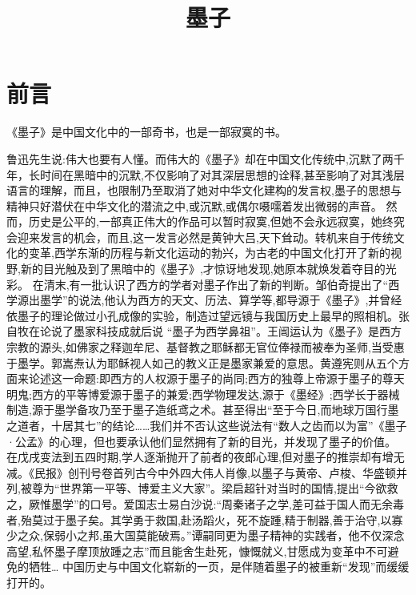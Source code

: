 \documentclass[12pt,UTF8]{ctexbook}
\title{\heiti\zihao{0} 墨子}
\author{}
\date{}
\begin{document}
\maketitle
\tableofcontents

\frontmatter
\chapter{前言}

《墨子》是中国文化中的一部奇书，也是一部寂寞的书。

鲁迅先生说:伟大也要有人懂。而伟大的《墨子》却在中国文化传统中,沉默了两千年，长时间在黑暗中的沉默,不仅影响了对其深层思想的诠释,甚至影响了对其浅层语言的理解，而且，也限制乃至取消了她对中华文化建构的发言权,墨子的思想与精神只好潜伏在中华文化的潜流之中,或沉默,或偶尔嗫嚅着发出微弱的声音。
然而，历史是公平的,一部真正伟大的作品可以暂时寂寞,但她不会永远寂寞，她终究会迎来发言的机会，而且,这一发言必然是黄钟大吕,天下耸动。转机来自于传统文化的变革,西学东渐的历程与新文化运动的勃兴，为古老的中国文化打开了新的视野,新的目光触及到了黑暗中的《墨子》,才惊讶地发现,她原本就焕发着夺目的光彩。
在清末,有一批认识了西方的学者对墨子作出了新的判断。邹伯奇提出了“西学源出墨学”的说法,他认为西方的天文、历法、算学等,都导源于《墨子》,并曾经依墨子的理论做过小孔成像的实验，制造过望远镜与我国历史上最早的照相机。张自牧在论说了墨家科技成就后说
“墨子为西学鼻祖”。王闿运认为《墨子》是西方宗教的源头,如佛家之释迦牟尼、基督教之耶稣都无官位俸禄而被奉为圣师,当受惠于墨学。郭嵩焘认为耶稣视人如己的教义正是墨家兼爱的意思。黄遵宪则从五个方面来论述这一命题:即西方的人权源于墨子的尚同;西方的独尊上帝源于墨子的尊天明鬼;西方的平等博爱源于墨子的兼爱;西学物理发达,源于《墨经》;西学长于器械制造,源于墨学备攻乃至于墨子造纸鸢之术。甚至得出“至于今日,而地球万国行墨之道者，十居其七”的结论……我们并不否认这些说法有“数人之齿而以为富”《墨子·公孟》的心理，但也要承认他们显然拥有了新的目光，并发现了墨子的价值。
在戊戌变法到五四时期,学人逐渐抛开了前者的夜郎心理,但对墨子的推崇却有增无减。《民报》创刊号卷首列古今中外四大伟人肖像,以墨子与黄帝、卢梭、华盛顿并列,被尊为“世界第一平等、博爱主义大家”。梁启超针对当时的国情,提出“今欲救之，厥惟墨学”的口号。爱国志士易白沙说:“周秦诸子之学,差可益于国人而无余毒者,殆莫过于墨子矣。其学勇于救国,赴汤蹈火，死不旋踵,精于制器,善于治守,以寡少之众,保弱小之邦,虽大国莫能破焉。”谭嗣同更为墨子精神的实践者，他不仅深念高望,私怀墨子摩顶放踵之志”而且能舍生赴死，慷慨就义,甘愿成为变革中不可避免的牺牲…
中国历史与中国文化崭新的一页，是伴随着墨子的被重新“发现”而缓缓打开的。
\end{document}
